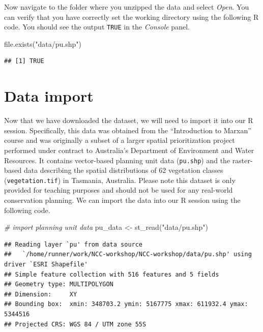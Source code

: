 \documentclass[
  12pt,
]{book}
\newenvironment{Shaded}{\begin{snugshade}}{\end{snugshade}}
\newcommand{\CommentTok}[1]{\textcolor[rgb]{0.56,0.35,0.01}{\textit{#1}}}
\newcommand{\FunctionTok}[1]{\textcolor[rgb]{0.00,0.00,0.00}{#1}}
\newcommand{\NormalTok}[1]{#1}
\newcommand{\OtherTok}[1]{\textcolor[rgb]{0.56,0.35,0.01}{#1}}
\newcommand{\StringTok}[1]{\textcolor[rgb]{0.31,0.60,0.02}{#1}}
\begin{document}
\clearpage

Now navigate to the folder where you unzipped the data and select \emph{Open}. You can verify that you have correctly set the working directory using the following R code. You should see the output \texttt{TRUE} in the \emph{Console} panel.

\begin{Shaded}
\begin{Highlighting}[]
\FunctionTok{file.exists}\NormalTok{(}\StringTok{"data/pu.shp"}\NormalTok{)}
\end{Highlighting}
\end{Shaded}

\begin{verbatim}
## [1] TRUE
\end{verbatim}

\hypertarget{data-import}{%
\section{Data import}\label{data-import}}

Now that we have downloaded the dataset, we will need to import it into our R session. Specifically, this data was obtained from the ``Introduction to Marxan'' course and was originally a subset of a larger spatial prioritization project performed under contract to Australia's Department of Environment and Water Resources. It contains vector-based planning unit data (\texttt{pu.shp}) and the raster-based data describing the spatial distributions of 62 vegetation classes (\texttt{vegetation.tif}) in Tasmania, Australia. Please note this dataset is only provided for teaching purposes and should not be used for any real-world conservation planning. We can import the data into our R session using the following code.

\begin{Shaded}
\begin{Highlighting}[]
\CommentTok{\# import planning unit data}
\NormalTok{pu\_data }\OtherTok{\textless{}{-}} \FunctionTok{st\_read}\NormalTok{(}\StringTok{"data/pu.shp"}\NormalTok{)}
\end{Highlighting}
\end{Shaded}

\begin{verbatim}
## Reading layer `pu' from data source 
##   `/home/runner/work/NCC-workshop/NCC-workshop/data/pu.shp' using driver `ESRI Shapefile'
## Simple feature collection with 516 features and 5 fields
## Geometry type: MULTIPOLYGON
## Dimension:     XY
## Bounding box:  xmin: 348703.2 ymin: 5167775 xmax: 611932.4 ymax: 5344516
## Projected CRS: WGS 84 / UTM zone 55S
\end{verbatim}
\end{document}
